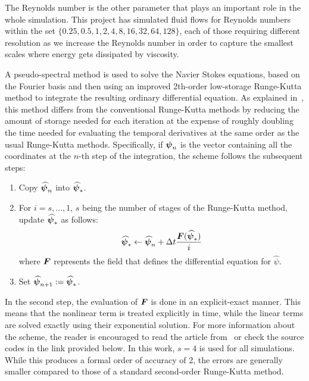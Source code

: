 \documentclass[../main.tex]{subfiles}
\begin{document}
The Reynolds number is the other parameter that plays an important role in the whole simulation. This project has simulated fluid flows for Reynolds numbers within the set $\{0.25, 0.5, 1, 2, 4, 8, 16, 32, 64, 128\}$, each of those requiring different resolution as we increase the Reynolds number in order to capture the smallest scales where energy gets dissipated by viscosity.

A pseudo-spectral method is used to solve the Navier Stokes equations, based on the Fourier basis and then using an improved 2th-order low-storage Runge-Kutta method to integrate the resulting ordinary differential equation. As explained in~\cite{rungekutta}, this method differs from the conventional Runge-Kutta methods by reducing the amount of storage needed for each iteration at the expense of roughly doubling the time needed for evaluating the temporal derivatives at the same order as the usual Runge-Kutta methods. Specifically, if $\boldsymbol{\psi}_n$ is the vector containing all the coordinates at the $n$-th step of the integration, the scheme follows the subsequent steps:
\begin{enumerate}
	\item Copy $\boldsymbol{\widehat\psi}_n$ into $\boldsymbol{\widehat\psi}_*$.
	\item For $i = s, \ldots, 1$, $s$ being the number of stages of the Runge-Kutta method, update $\boldsymbol{\widehat\psi}_*$ as follows:
	      \begin{equation}
		      \boldsymbol{\widehat\psi}_* \leftarrow \boldsymbol{\widehat\psi}_n + \Delta t \frac{\boldsymbol{F}(\boldsymbol{\widehat\psi}_*)}{i}
	      \end{equation}
	      where $\boldsymbol{F}$ represents the field that defines the differential equation for ${\widehat\psi}$.
	\item Set $\boldsymbol{\widehat\psi}_{n+1} := \boldsymbol{\widehat\psi}_*$.
\end{enumerate}
In the second step, the evaluation of $\boldsymbol{F}$ is done in an explicit-exact manner. This means that the nonlinear term is treated explicitly in time, while the linear terms are solved exactly using their exponential solution. For more information about the scheme, the reader is encouraged to read the article from~\cite{rungekutta} or check the source codes in the link provided below. In this work, $s=4$ is used for all simulations. While this produces a formal order of accuracy of 2, the errors are generally smaller compared to those of a standard second-order Runge-Kutta method.
\end{document}
